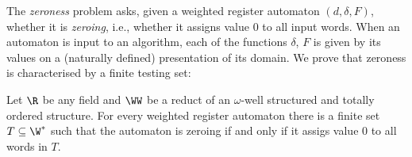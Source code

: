 The \emph{zeroness} problem asks, given a weighted register automaton $(d, \delta, F)$,
whether it is \emph{zeroing}, i.e., whether it assigns value 0 to all input words.
When an automaton is input to an algorithm, 
each of the functions $\delta$, $F$ is given by its values on a
(naturally defined) presentation of its domain.
We prove that zeroness is characterised by a finite testing set:
%
\begin{theorem}\label{thm:zeroness}
Let $\R$ be any field and
$\WW$ be a reduct of an $\omega$-well structured and totally ordered structure.
For every weighted register automaton there is a finite set $T\subseteq \W^*$ 
such that the automaton is zeroing if and only if
it assigs value 0 to all words in $T$.
\end{theorem}
%
%
%
